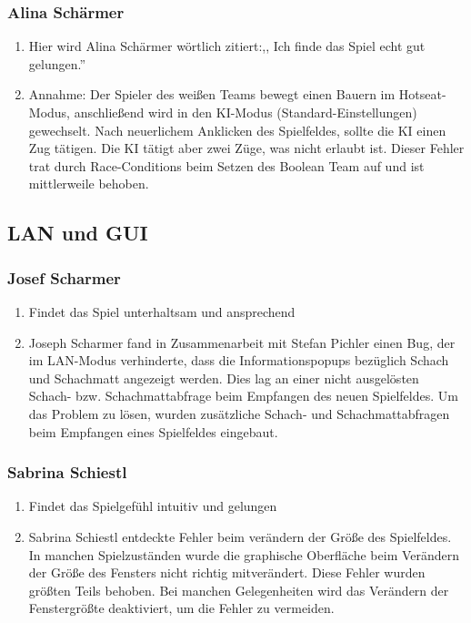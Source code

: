 \documentclass[12pt,a4paper]{article}
\begin{document}
\subsubsection*{Alina Schärmer}
\begin{enumerate}[I]
	\item{Hier wird Alina Schärmer wörtlich zitiert:,, Ich finde das Spiel echt gut gelungen.''}
	\item{Annahme: Der Spieler des weißen Teams bewegt einen Bauern im Hotseat-Modus, anschließend wird in den KI-Modus (Standard-Einstellungen) gewechselt. Nach neuerlichem Anklicken des Spielfeldes, sollte die KI einen Zug tätigen. Die KI tätigt aber zwei Züge, was nicht erlaubt ist. Dieser Fehler trat durch Race-Conditions beim Setzen des Boolean Team auf und ist mittlerweile behoben. }
\end{enumerate}

\subsection{LAN und GUI}
\label{SUBSEC:BETALAN}

\subsubsection{Josef Scharmer}
\begin{enumerate}
	\item{Findet das Spiel unterhaltsam und ansprechend}
	
	\item{Joseph Scharmer fand in Zusammenarbeit mit Stefan Pichler einen Bug, der im LAN-Modus verhinderte, dass die Informationspopups bezüglich Schach und Schachmatt angezeigt werden. Dies lag an einer nicht ausgelösten Schach- bzw. Schachmattabfrage beim Empfangen des neuen Spielfeldes. Um das Problem zu lösen, wurden zusätzliche Schach- und Schachmattabfragen beim Empfangen eines Spielfeldes eingebaut.}
\end{enumerate}

\subsubsection{Sabrina Schiestl}
\begin{enumerate}
	\item{Findet das Spielgefühl intuitiv und gelungen}

	\item{Sabrina Schiestl entdeckte Fehler beim verändern der Größe des Spielfeldes. In manchen Spielzuständen wurde die graphische Oberfläche beim Verändern der Größe des Fensters nicht richtig mitverändert. Diese Fehler wurden größten Teils behoben. Bei manchen Gelegenheiten wird das Verändern der Fenstergrößte deaktiviert, um die Fehler zu vermeiden. }
\end{enumerate}
\end{document}
